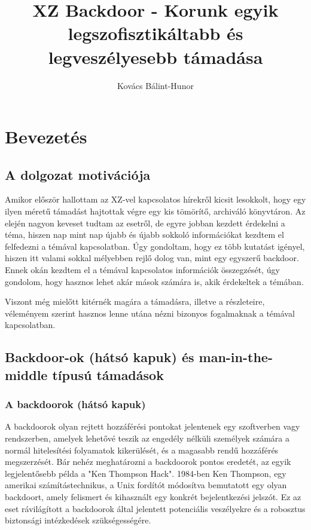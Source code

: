 \documentclass[11pt]{article}
\title{XZ Backdoor - Korunk egyik legszofisztikáltabb és legveszélyesebb támadása}
\author{Kovács Bálint-Hunor}
\begin{document}
\maketitle

\section{Bevezetés}

\subsection{A dolgozat motivációja}
Amikor először hallottam az XZ-vel kapcsolatos hírekről kicsit lesokkolt, hogy egy ilyen méretű támadást hajtottak végre egy kis tömörítő, archiváló könyvtáron. Az elején nagyon keveset tudtam az esetről, de egyre jobban kezdett érdekelni a téma, hiszen nap mint nap újabb és újabb sokkoló információkat kezdtem el felfedezni a témával kapcsolatban. Úgy gondoltam, hogy ez több kutatást igényel, hiszen itt valami sokkal mélyebben rejlő dolog van, mint egy egyszerű backdoor. 
Ennek okán kezdtem el a témával kapcsolatos információk összegzését, úgy gondolom, hogy hasznos lehet akár mások számára is, akik érdekeltek a témában.

Viszont még mielőtt kitérnék magára a támadásra, illetve a részleteire, véleményem szerint hasznos lenne utána nézni bizonyos fogalmaknak a témával kapcsolatban.

\subsection{Backdoor-ok (hátsó kapuk) és man-in-the-middle típusú támadások}

\subsubsection{A backdoorok (hátsó kapuk)}

A backdoorok olyan rejtett hozzáférési pontokat jelentenek egy szoftverben vagy rendszerben, amelyek lehetővé teszik az engedély nélküli személyek számára a normál hitelesítési folyamatok kikerülését, és a magasabb rendű hozzáférés megszerzését. Bár nehéz meghatározni a backdoorok pontos eredetét, az egyik legjelentősebb példa a "Ken Thompson Hack". 1984-ben Ken Thompson, egy amerikai számítástechnikus, a Unix fordítót módosítva bemutatott egy olyan backdoort, amely  felismert és kihasznált egy konkrét bejelentkezési jelszót. Ez az eset rávilágított a backdoorok által jelentett potenciális veszélyekre és a robosztus biztonsági intézkedések szükségességére.\cite{thompson1984reflections}
\end{document}
